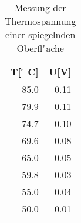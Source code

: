 \begin{table}
\begin{center}
\begin{tabular}{r|r}
T[$^\circ$ C] & U[V] \\
\hline
85.0 & 0.11 \\
79.9 & 0.11 \\
74.7 & 0.10 \\
69.6 & 0.08 \\
65.0 & 0.05 \\
59.8 & 0.03 \\
55.0 & 0.04 \\
50.0 & 0.01 \\
\end{tabular}
\caption[Thermospannung]{Messung der Thermospannung einer spiegelnden Oberfl"ache}
\label{spiegel}
\end{center}
\end{table}
